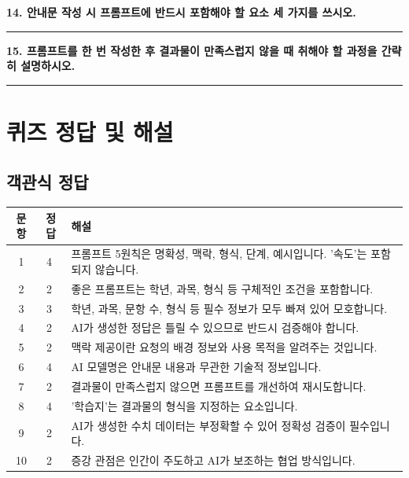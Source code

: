 \documentclass[11pt,a4paper]{article}
\begin{document}
\textbf{14. 안내문 작성 시 프롬프트에 반드시 포함해야 할 요소 세 가지를 쓰시오.}

\vspace{5mm}
\noindent\rule{\textwidth}{0.4pt}
\vspace{10mm}

\textbf{15. 프롬프트를 한 번 작성한 후 결과물이 만족스럽지 않을 때 취해야 할 과정을 간략히 설명하시오.}

\vspace{5mm}
\noindent\rule{\textwidth}{0.4pt}
\vspace{25mm}

\newpage

\section*{퀴즈 정답 및 해설}

\subsection*{객관식 정답}

\begin{center}
\begin{tabular}{|c|c|l|}
\hline
\rowcolor{lightblue}
\textbf{문항} & \textbf{정답} & \textbf{해설} \\
\hline
1 & \textcircled{\small 4} & 프롬프트 5원칙은 명확성, 맥락, 형식, 단계, 예시입니다. '속도'는 포함되지 않습니다. \\
\hline
2 & \textcircled{\small 2} & 좋은 프롬프트는 학년, 과목, 형식 등 구체적인 조건을 포함합니다. \\
\hline
3 & \textcircled{\small 3} & 학년, 과목, 문항 수, 형식 등 필수 정보가 모두 빠져 있어 모호합니다. \\
\hline
4 & \textcircled{\small 2} & AI가 생성한 정답은 틀릴 수 있으므로 반드시 검증해야 합니다. \\
\hline
5 & \textcircled{\small 2} & 맥락 제공이란 요청의 배경 정보와 사용 목적을 알려주는 것입니다. \\
\hline
6 & \textcircled{\small 4} & AI 모델명은 안내문 내용과 무관한 기술적 정보입니다. \\
\hline
7 & \textcircled{\small 2} & 결과물이 만족스럽지 않으면 프롬프트를 개선하여 재시도합니다. \\
\hline
8 & \textcircled{\small 4} & '학습지'는 결과물의 형식을 지정하는 요소입니다. \\
\hline
9 & \textcircled{\small 2} & AI가 생성한 수치 데이터는 부정확할 수 있어 정확성 검증이 필수입니다. \\
\hline
10 & \textcircled{\small 2} & 증강 관점은 인간이 주도하고 AI가 보조하는 협업 방식입니다. \\
\hline
\end{tabular}
\end{center}
\end{document}
